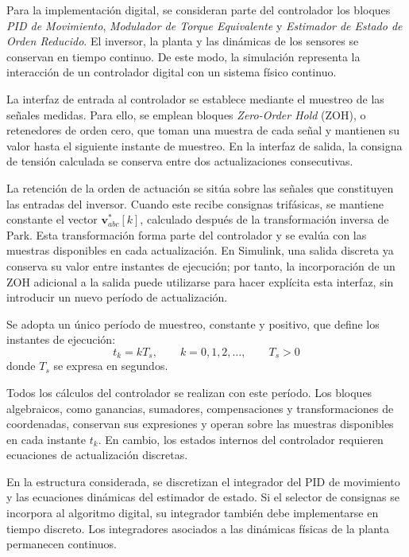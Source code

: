 \documentclass[blue,fullpaper]{ludusofficial}  %
\begin{document}
Para la implementación digital, se consideran parte del controlador los bloques \textit{PID de Movimiento}, \textit{Modulador de Torque Equivalente} y \textit{Estimador de Estado de Orden Reducido}. El inversor, la planta y las dinámicas de los sensores se conservan en tiempo continuo. De este modo, la simulación representa la interacción de un controlador digital con un sistema físico continuo.

La interfaz de entrada al controlador se establece mediante el muestreo de las señales medidas. Para ello, se emplean bloques \textit{Zero-Order Hold} (ZOH), o retenedores de orden cero, que toman una muestra de cada señal y mantienen su valor hasta el siguiente instante de muestreo. En la interfaz de salida, la consigna de tensión calculada se conserva entre dos actualizaciones consecutivas.

La retención de la orden de actuación se sitúa sobre las señales que constituyen las entradas del inversor. Cuando este recibe consignas trifásicas, se mantiene constante el vector $\mathbf{v}_{abc}^{*}[k]$, calculado después de la transformación inversa de Park. Esta transformación forma parte del controlador y se evalúa con las muestras disponibles en cada actualización. En Simulink, una salida discreta ya conserva su valor entre instantes de ejecución; por tanto, la incorporación de un ZOH adicional a la salida puede utilizarse para hacer explícita esta interfaz, sin introducir un nuevo período de actualización.

Se adopta un único período de muestreo, constante y positivo, que define los instantes de ejecución:
\begin{equation}
    t_k=kT_s,
    \qquad k=0,1,2,\ldots,
    \qquad T_s>0
\end{equation}
donde $T_s$ se expresa en segundos.

Todos los cálculos del controlador se realizan con este período. Los bloques algebraicos, como ganancias, sumadores, compensaciones y transformaciones de coordenadas, conservan sus expresiones y operan sobre las muestras disponibles en cada instante $t_k$. En cambio, los estados internos del controlador requieren ecuaciones de actualización discretas.

En la estructura considerada, se discretizan el integrador del PID de movimiento y las ecuaciones dinámicas del estimador de estado. Si el selector de consignas se incorpora al algoritmo digital, su integrador también debe implementarse en tiempo discreto. Los integradores asociados a las dinámicas físicas de la planta permanecen continuos.
\end{document}
